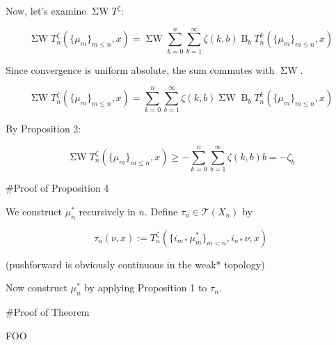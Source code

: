 \documentclass[a4paper]{article}
\newcommand{\B}{\operatorname{B}_b}
\newcommand{\SW}{\operatorname{\Sigma W}}
\begin{document}
Now, let's examine ${\SW T^\zeta}$:

$$\SW T^\zeta_n(\{\mu_m \}_{m \leq n},x)=\SW \sum_{k=0}^n \sum_{b=1}^\infty \zeta(k,b) \B T^k_n(\{\mu_m \}_{m \leq n},x)$$

Since convergence is uniform absolute, the sum commutes with ${\SW}$.

$$\SW T^\zeta_n(\{\mu_m \}_{m \leq n},x)=\sum_{k=0}^n \sum_{b=1}^\infty \zeta(k,b) \SW \B T^k_n(\{\mu_m \}_{m \leq n},x)$$

By Proposition 2:


$$\SW T^\zeta_n(\{\mu_m \}_{m \leq n},x)\geq -\sum_{k=0}^n \sum_{b=1}^\infty \zeta(k,b)b = -\zeta_b$$

\#Proof of Proposition 4

We construct ${\mu^*_n}$ recursively in ${n}$. Define ${\tau_n \in \mathcal{T}(X_n)}$ by

$$\tau_n(\nu,x):=T_n^\zeta(\{i_{m*}\mu^*_m\}_{m<n}, i_{n*} \nu, x)$$

(pushforward is obviously continuous in the weak* topology)

Now construct ${\mu^*_n}$ by applying Proposition 1 to ${\tau_n}$.

\#Proof of Theorem

FOO
\end{document}
